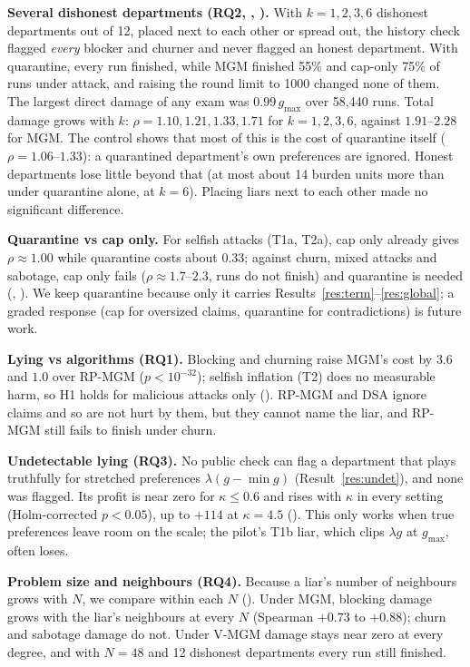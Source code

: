 \documentclass{article}
\theoremstyle{definition}
\newcommand{\1}{\mathbf{1}}
\newcommand{\gmax}{g_{\max}}
\begin{document}
\textbf{Several dishonest departments (RQ2, , ).} With $k=1,2,3,6$ dishonest departments out of 12, placed next to each other or spread out, the history check flagged \emph{every} blocker and churner and never flagged an honest department. With quarantine, every run finished, while MGM finished 55\% and cap-only 75\% of runs under attack, and raising the round limit to 1000 changed none of them. The largest direct damage of any exam was $0.99\,\gmax$ over 58{,}440 runs. Total damage grows with $k$: $\rho=1.10, 1.21, 1.33, 1.71$ for $k=1,2,3,6$, against $1.91$--$2.28$ for MGM. The control shows that most of this is the cost of quarantine itself ($\rho=1.06$--$1.33$): a quarantined department's own preferences are ignored. Honest departments lose little beyond that (at most about 14 burden units more than under quarantine alone, at $k=6$). Placing liars next to each other made no significant difference.

\textbf{Quarantine vs cap only.} For selfish attacks (T1a, T2a), cap only already gives $\rho\approx1.00$ while quarantine costs about $0.33$; against churn, mixed attacks and sabotage, cap only fails ($\rho\approx1.7$--$2.3$, runs do not finish) and quarantine is needed (, ). We keep quarantine because only it carries Results~\ref{res:term}--\ref{res:global}; a graded response (cap for oversized claims, quarantine for contradictions) is future work.



\textbf{Lying vs algorithms (RQ1).} Blocking and churning raise MGM's cost by $3.6$ and $1.0$ over RP-MGM ($p<10^{-32}$); selfish inflation (T2) does no measurable harm, so H1 holds for malicious attacks only (). RP-MGM and DSA ignore claims and so are not hurt by them, but they cannot name the liar, and RP-MGM still fails to finish under churn.

\textbf{Undetectable lying (RQ3).} No public check can flag a department that plays truthfully for stretched preferences $\lambda(g-\min g)$ (Result~\ref{res:undet}), and none was flagged. Its profit is near zero for $\kappa\le0.6$ and rises with $\kappa$ in every setting (Holm-corrected $p<0.05$), up to $+114$ at $\kappa=4.5$ (). This only works when true preferences leave room on the scale; the pilot's T1b liar, which clips $\lambda g$ at $\gmax$, often loses.

\textbf{Problem size and neighbours (RQ4).} Because a liar's number of neighbours grows with $N$, we compare within each $N$ (). Under MGM, blocking damage grows with the liar's neighbours at every $N$ (Spearman $+0.73$ to $+0.88$); churn and sabotage damage do not. Under V-MGM damage stays near zero at every degree, and with $N=48$ and 12 dishonest departments every run still finished.
\end{document}
